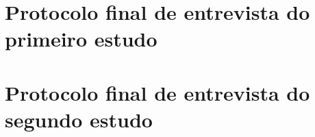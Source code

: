 \chapter{Protocolo final de entrevista do primeiro estudo}

\chapter{Protocolo final de entrevista do segundo estudo}
